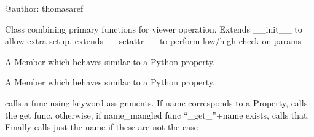 \documentclass[letterpaper,10pt,english]{sphinxmanual}
\begin{document}
@author: thomasaref

\begin{fulllineitems}
\label{core_doc/backbone:taref.core.backbone.Backbone}
Class combining primary functions for viewer operation.
Extends \_\_init\_\_ to allow extra setup.
extends \_\_setattr\_\_ to perform low/high check on params

\begin{fulllineitems}
\label{core_doc/backbone:taref.core.backbone.Backbone.all_main_params}
A Member which behaves similar to a Python property.

\end{fulllineitems}


\begin{fulllineitems}
\label{core_doc/backbone:taref.core.backbone.Backbone.all_params}
A Member which behaves similar to a Python property.

\end{fulllineitems}


\begin{fulllineitems}
\label{core_doc/backbone:taref.core.backbone.Backbone.app}
\end{fulllineitems}


\begin{fulllineitems}
\label{core_doc/backbone:taref.core.backbone.Backbone.call_func}
calls a func using keyword assignments. If name corresponds to a Property, calls the get func.
otherwise, if name\_mangled func ``\_get\_''+name exists, calls that. Finally calls just the name if these are not the case

\end{fulllineitems}



\end{fulllineitems}
\end{document}
